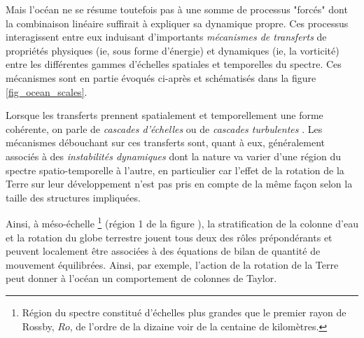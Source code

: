 Mais l'océan ne se résume toutefois pas à une somme de processus "forcés" dont la combinaison linéaire suffirait à expliquer sa dynamique propre. Ces processus interagissent  entre eux induisant d'importants \textit {mécanismes de transferts} de propriétés physiques (ie, sous forme d'énergie) et dynamiques (ie, la vorticité) entre les différentes gammes d'échelles spatiales et temporelles du spectre. Ces mécanismes sont en partie évoqués ci-après et schématisés dans la figure \ref{fig_ocean_scales}. 

Lorsque les transferts prennent spatialement et temporellement une forme cohérente, on parle de \textit{cascades d'échelles} ou de \textit{cascades turbulentes} \citep{lapeyre_topologie_2000}. Les mécanismes débouchant sur ces transferts sont, quant à eux, généralement associés à des \textit{instabilités dynamiques} dont la nature va varier d'une région du spectre spatio-temporelle à l'autre, en particulier car l'effet de la rotation de la Terre sur leur développement n'est pas pris en compte de la même façon selon la taille des structures impliquées.

Ainsi, à méso-échelle \footnote{Région du spectre constitué d'échelles plus grandes que le premier rayon de Rossby, $Ro$, de l'ordre de la dizaine voir de la centaine de kilomètres.} (région 1 de la figure ), la stratification de la colonne d'eau et la rotation du globe terrestre jouent tous deux des rôles prépondérants et peuvent localement être associées à des équations de bilan de quantité de mouvement équilibrées. Ainsi, par exemple, l'action de la rotation de la Terre peut donner à l'océan un comportement de colonnes de Taylor.

